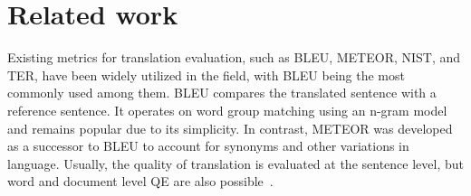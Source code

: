 \documentclass[runningheads]{llncs}
\begin{document}






\section{Related work}\label{relatedwork}

Existing metrics for translation evaluation, such as BLEU\cite{bleu}, METEOR\cite{meteor}, NIST\cite{nist}, and TER\cite{TER}, have been widely utilized in the field, with BLEU being the most commonly used among them. BLEU compares the translated sentence with a reference sentence. It operates on word group matching using an n-gram model and remains popular due to its simplicity. In contrast, METEOR was developed as a successor to BLEU to account for synonyms and other variations in language. Usually, the quality of translation is evaluated at the sentence level, but word and document level QE are also possible~\cite{specia18}.
\end{document}
